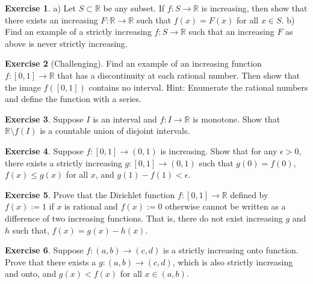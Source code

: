 \documentclass[12pt]{book}
\newcommand{\R}{{\mathbb{R}}}
\theoremstyle{plain}
\theoremstyle{remark}
\theoremstyle{definition}
\theoremstyle{exercise}
\newtheorem{exercise}{Exercise}[section]
\theoremstyle{example}
\begin{document}
\begin{exercise}
a) Let $S \subset \R$ be any subset.  If $f \colon S \to \R$ is increasing,
then show that there exists an increasing $F \colon \R \to \R$
such that $f(x) = F(x)$ for all $x \in S$.
b) Find an example of a strictly increasing $f \colon S \to \R$ such that
an increasing $F$ as above is never strictly increasing.
\end{exercise}

\begin{exercise}[Challenging] \label{exercise:increasingfuncdiscatQ}
Find an example of an increasing function $f \colon [0,1] \to \R$
that has a discontinuity at each rational number.  Then show that the image
$f([0,1])$ contains no interval.  Hint: Enumerate
the rational numbers and define
the function with a series.
\end{exercise}

\begin{exercise}
Suppose $I$ is an interval and $f \colon I \to \R$ is monotone.
Show that $\R \setminus f(I)$ is a countable union of disjoint intervals.
\end{exercise}

\begin{exercise}
Suppose $f \colon [0,1] \to (0,1)$ is increasing.  Show that for any
$\epsilon > 0$, there exists
a strictly increasing $g \colon [0,1] \to (0,1)$ such that
$g(0) = f(0)$, $f(x) \leq g(x)$ for all $x$, and $g(1)-f(1) < \epsilon$.
\end{exercise}

\begin{exercise}
Prove that the Dirichlet function $f \colon [0,1] \to\R$ defined by $f(x) :=
1$ if $x$ is rational and $f(x) := 0$ otherwise cannot be written as a
difference of two increasing functions.  That is, there do not exist
increasing $g$ and $h$ such that, $f(x) = g(x) - h(x)$.
\end{exercise}

\begin{exercise}
Suppose $f \colon (a,b) \to (c,d)$ is a strictly increasing
onto function.  Prove that there exists a $g \colon (a,b) \to (c,d)$,
which is also strictly increasing and onto, and $g(x) < f(x)$ for all $x \in
(a,b)$.
\end{exercise}



\end{document}
